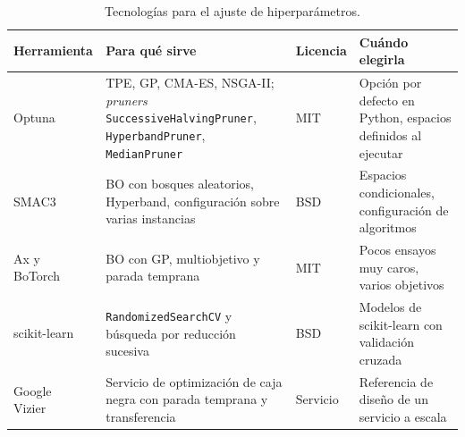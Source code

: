 \addtocounter{definicion}{1}%

\begin{table}[ht]
\centering\small
\begin{tabularx}{\textwidth}{@{}>{\raggedright\arraybackslash}p{2.8cm}>{\raggedright\arraybackslash}X>{\raggedright\arraybackslash}p{1.4cm}>{\raggedright\arraybackslash}p{3.5cm}@{}}
\toprule
Herramienta & Para qué sirve & Licencia & Cuándo elegirla \\
\midrule
Optuna~\cite{optuna} & TPE, GP, CMA-ES, NSGA-II; \emph{pruners} \texttt{SuccessiveHalvingPruner}, \texttt{HyperbandPruner}, \texttt{MedianPruner} & MIT & Opción por defecto en Python, espacios definidos al ejecutar \\
SMAC3~\cite{smac3} & BO con bosques aleatorios, Hyperband, configuración sobre varias instancias & BSD & Espacios condicionales, configuración de algoritmos \\
Ax y BoTorch~\cite{ax,botorch} & BO con GP, multiobjetivo y parada temprana & MIT & Pocos ensayos muy caros, varios objetivos \\
scikit-learn & \texttt{RandomizedSearchCV} y búsqueda por reducción sucesiva & BSD & Modelos de scikit-learn con validación cruzada \\
Google Vizier~\cite{vizier} & Servicio de optimización de caja negra con parada temprana y transferencia & Servicio & Referencia de diseño de un servicio a escala \\
\bottomrule
\end{tabularx}
\caption{Tecnologías para el ajuste de hiperparámetros.}
\label{tab:tec6}
\end{table}

\addtocounter{definicion}{1}%

